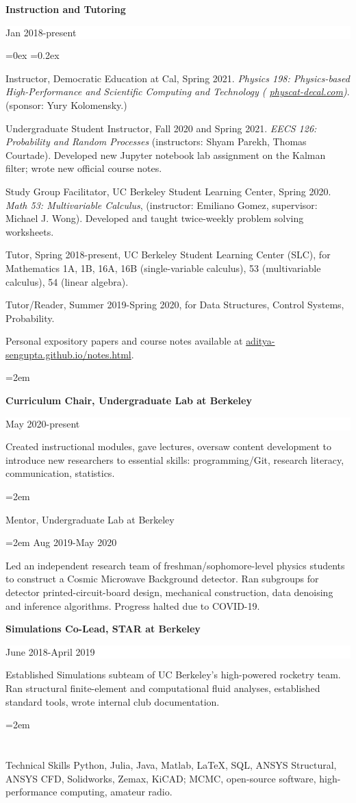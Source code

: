 \documentclass[paper=a4,fontsize=12pt]{scrartcl}
\newcommand{\cvlist}{%

    \rightmargin=0in
    \leftmargin=0.15in
    \topsep=0ex
    \partopsep=0pt
    \itemsep=0.2ex 
    \parsep=0pt
    \itemindent=0.0\leftmargin
    \listparindent=3.0\leftmargin
    \settowidth{\labelsep}{~}
    \leftskip=-10.1in
    \parindent=-0.1in
}
\newcommand{\NewPart}[1]{\section*{{#1}}}
\newcommand{\EducationEntry}[4]{
		\noindent \textbf{#1} \hfill      %
		\colorbox{White}{%
			\parbox{5cm}{%
			\hfill\color{Black}#2}} \par  %
		\noindent #3 \par        %
		\noindent\hangindent=2em\hangafter=0 \small #4 %
		\normalsize \par}
\begin{document}
\EducationEntry{Instruction and Tutoring}{Jan 2018-present}{\vspace{-0.5cm}
    \begin{list}{\textbullet}{\cvlist}
        \setlength{\itemsep}{0pt}
        \item Instructor, Democratic Education at Cal, Spring 2021. \textit{Physics 198: Physics-based High-Performance and Scientific Computing and Technology (\color{blue} \href{physcat-decal.com}{physcat-decal.com})}. (sponsor: Yury Kolomensky.)
        \item Undergraduate Student Instructor, Fall 2020 and Spring 2021. \textit{EECS 126: Probability and Random Processes} (instructors: Shyam Parekh, Thomas Courtade). Developed new Jupyter notebook lab assignment on the Kalman filter; wrote new official course notes.
        \item Study Group Facilitator, UC Berkeley Student Learning Center, Spring 2020. \textit{Math 53: Multivariable Calculus}, (instructor: Emiliano Gomez, supervisor: Michael J. Wong). Developed and taught twice-weekly problem solving worksheets.
        \item Tutor, Spring 2018-present, UC Berkeley Student Learning Center (SLC), for Mathematics 1A, 1B, 16A, 16B (single-variable calculus), 53 (multivariable calculus), 54 (linear algebra).
        \item Tutor/Reader, Summer 2019-Spring 2020, for Data Structures, Control Systems, Probability.
        \item Personal expository papers and course notes available at {\color{blue} \href{haditya-sengupta.github.io/notes.html}{aditya-sengupta.github.io/notes.html}}.
    \end{list}
}\hfill

\EducationEntry{Curriculum Chair, Undergraduate Lab at Berkeley}{May 2020-present}{Created instructional modules, gave lectures, oversaw content development to introduce new researchers to essential skills: programming/Git, research literacy, communication, statistics.
}

\EducationEntry{Mentor, Undergraduate Lab at Berkeley}{Aug 2019-May 2020}{Led an independent research team of freshman/sophomore-level physics students to construct a Cosmic Microwave Background detector. Ran subgroups for detector printed-circuit-board design, mechanical construction, data denoising and inference algorithms. Progress halted due to COVID-19.}

\EducationEntry{Simulations Co-Lead, STAR at Berkeley}{June 2018-April 2019}{Established Simulations subteam of UC Berkeley's high-powered rocketry team. Ran structural finite-element and computational fluid analyses, established standard tools, wrote internal club documentation.
}

\NewPart{Technical Skills}
Python, Julia, Java, Matlab, LaTeX, SQL, ANSYS Structural, ANSYS CFD, Solidworks, Zemax, KiCAD; MCMC, open-source software, high-performance computing, amateur radio.
\end{document}
